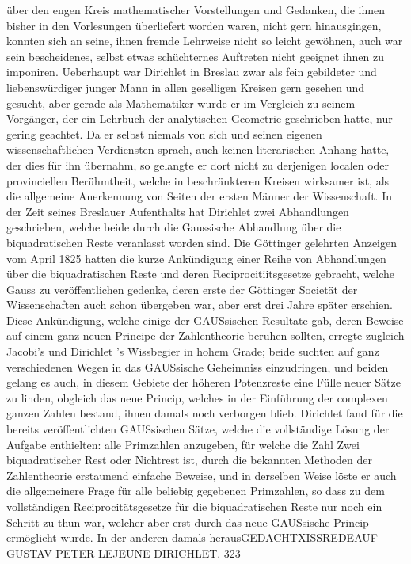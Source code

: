 \documentclass[11pt]{article}
\begin{document}
\noindent über den engen Kreis mathematischer Vorstellungen und Gedanken, die ihnen bisher in den Vorlesungen überliefert worden waren, nicht gern hinausgingen, konnten sich an seine, ihnen fremde Lehrweise nicht so leicht gewöhnen, auch war sein bescheidenes, selbst etwas schüchternes Auftreten nicht geeignet ihnen zu imponiren. Ueberhaupt war Dirichlet in Breslau zwar als fein gebildeter und liebenswürdiger junger Mann in allen geselligen Kreisen gern gesehen und gesucht, aber gerade als Mathematiker wurde er im Vergleich zu seinem Vorgänger, der ein Lehrbuch der analytischen Geometrie geschrieben hatte, nur gering geachtet. Da er selbst niemals von sich und seinen eigenen wissenschaftlichen Verdiensten sprach, auch keinen literarischen Anhang hatte, der dies für ihn übernahm, so gelangte er dort nicht zu derjenigen localen oder provinciellen Berühmtheit, welche in beschränkteren Kreisen wirksamer ist, als die allgemeine Anerkennung von Seiten der ersten Männer der Wissenschaft. In der Zeit seines Breslauer Aufenthalts hat Dirichlet zwei Abhandlungen geschrieben, welche beide durch die Gaussische Abhandlung über die biquadratischen Reste veranlasst worden sind. Die Göttinger gelehrten Anzeigen vom April 1825 hatten die kurze Ankündigung einer Reihe von Abhandlungen über die biquadratischen Reste und deren Reciprocitiitsgesetze gebracht, welche Gauss zu veröffentlichen gedenke, deren erste der Göttinger Societät der Wissenschaften auch schon übergeben war, aber erst drei Jahre später erschien. Diese Ankündigung, welche einige der GAUSsischen Resultate gab, deren Beweise auf einem ganz neuen Principe der Zahlentheorie beruhen sollten, erregte zugleich Jacobi’s und Dirichlet ’s Wissbegier in hohem Grade; beide suchten auf ganz verschiedenen Wegen in das GAUSsische Geheimniss einzudringen, und beiden gelang es auch, in diesem Gebiete der höheren Potenzreste eine Fülle neuer Sätze zu linden, obgleich das neue Princip, welches in der Einführung der complexen ganzen Zahlen bestand, ihnen damals noch verborgen blieb. Dirichlet fand für die bereits veröffentlichten GAUSsischen Sätze, welche die vollständige Lösung der Aufgabe enthielten: alle Primzahlen anzugeben, für welche die Zahl Zwei biquadratischer Rest oder Nichtrest ist, durch die bekannten Methoden der Zahlentheorie erstaunend einfache Beweise, und in derselben Weise löste er auch die allgemeinere Frage für alle beliebig gegebenen Primzahlen, so dass zu dem vollständigen Reciprocitätsgesetze für die biquadratischen Reste nur noch ein Schritt zu thun war, welcher aber erst durch das neue GAUSsische Princip ermöglicht wurde. In der anderen damals herausGEDACHTXISSREDEAUF GUSTAV PETER LEJEUNE DIRICHLET. 323
\par
\end{document}
